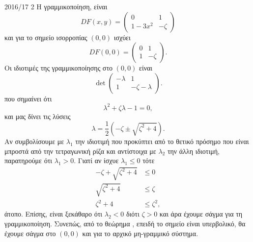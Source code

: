 \begin{solution}{2016/17 2}
    Η γραμμικοποίηση, είναι
    \begin{equation*}
        DF(x, y) =
        \begin{pmatrix}
            0 & 1 \\
            1 - 3x^2 & -\zeta
        \end{pmatrix}
    \end{equation*}
    και για το σημείο ισορροπίας \( (0, 0) \) ισχύει
    \begin{equation*}
        DF(0, 0) =
        \begin{pmatrix}
            0 & 1 \\
            1 & -\zeta
        \end{pmatrix}.
    \end{equation*}
    Οι ιδιοτιμές της γραμμικοποίησης στο \( (0, 0) \) είναι
    \begin{equation*}
        \det
        \begin{pmatrix}
            -\lambda & 1 \\
            1 & -\zeta - \lambda
        \end{pmatrix}.
    \end{equation*}
    που σημαίνει ότι
    \begin{equation*}
        \lambda^2 + \zeta \lambda - 1 = 0,
    \end{equation*}
    και μας δίνει τις λύσεις
    \begin{equation*}
        \lambda = \frac{1}{2}\left( -\zeta \pm \sqrt{\zeta^2 + 4} \right).
    \end{equation*}
    Αν συμβολίσουμε με \( \lambda_1 \) την ιδιοτιμή που προκύπτει από το θετικό
    πρόσημο που είναι μπροστά από την τετραγωνική ρίζα και αντίστοιχα με
    \( \lambda_2 \) την άλλη ιδιοτιμή, παρατηρούμε ότι \( \lambda_1 > 0 \).
    Γιατί αν ίσχυε \( \lambda_1 \leq 0 \) τότε
    \begin{align*}
        -\zeta + \sqrt{\zeta^2 + 4} &\leq 0 \\
        \sqrt{\zeta^2 + 4} &\leq \zeta \\
        \zeta^2 + 4 &\leq \zeta^2,
    \end{align*}
    άτοπο. Επίσης, είναι ξεκάθαρο ότι \( \lambda_2 < 0 \) διότι \( \zeta > 0 \)
    και άρα έχουμε σάγμα για τη γραμμικοποίηση. Συνεπώς, από το θεώρημα
    , επειδή το σημείο είναι υπερβολικό, θα έχουμε σάγμα στο
    \( (0, 0) \) και για το αρχικό μη-γραμμικό σύστημα.


\end{solution}
